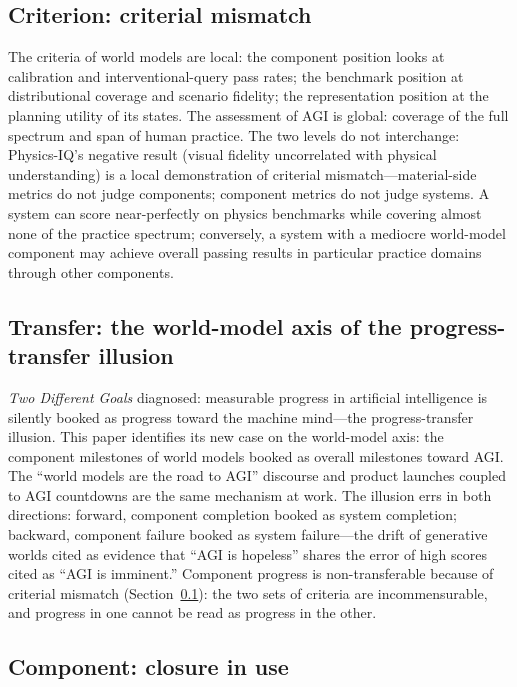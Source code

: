 \documentclass[10pt]{article}
\begin{document}
\subsection{Criterion: criterial mismatch}\label{sec:criteria}

The criteria of world models are local: the component position looks at calibration and interventional-query pass rates; the benchmark position at distributional coverage and scenario fidelity; the representation position at the planning utility of its states. The assessment of AGI is global: coverage of the full spectrum and span of human practice\cite{yu2026fitting}. The two levels do not interchange: Physics-IQ's negative result (visual fidelity uncorrelated with physical understanding\cite{motamed2025physicsiq}) is a local demonstration of criterial mismatch---material-side metrics do not judge components; component metrics do not judge systems. A system can score near-perfectly on physics benchmarks while covering almost none of the practice spectrum; conversely, a system with a mediocre world-model component may achieve overall passing results in particular practice domains through other components.

\subsection{Transfer: the world-model axis of the progress-transfer illusion}\label{sec:transfer}

\emph{Two Different Goals}\cite{yu2026twogoals} diagnosed: measurable progress in artificial intelligence is silently booked as progress toward the machine mind---the progress-transfer illusion. This paper identifies its new case on the world-model axis: the component milestones of world models booked as overall milestones toward AGI. The ``world models are the road to AGI'' discourse and product launches coupled to AGI countdowns are the same mechanism at work. The illusion errs in both directions: forward, component completion booked as system completion; backward, component failure booked as system failure---the drift of generative worlds cited as evidence that ``AGI is hopeless'' shares the error of high scores cited as ``AGI is imminent.'' Component progress is non-transferable because of criterial mismatch (Section~\ref{sec:criteria}): the two sets of criteria are incommensurable, and progress in one cannot be read as progress in the other.

\subsection{Component: closure in use}\label{sec:closure}
\end{document}
